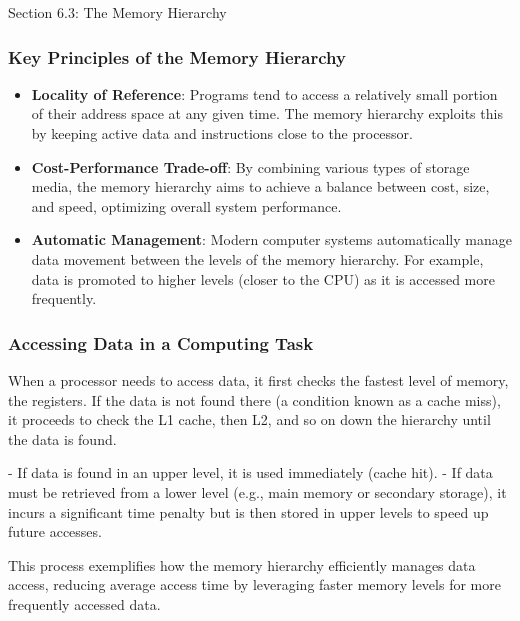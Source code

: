 \begin{notes}{Section 6.3: The Memory Hierarchy}
    \vspace*{1em}
    
    \subsubsection*{Key Principles of the Memory Hierarchy}
    
    \begin{itemize}
        \item \textbf{Locality of Reference}: Programs tend to access a relatively small portion of their address space at any given time. The memory hierarchy exploits this by keeping active data 
        and instructions close to the processor.
        \item \textbf{Cost-Performance Trade-off}: By combining various types of storage media, the memory hierarchy aims to achieve a balance between cost, size, and speed, optimizing overall system performance.
        \item \textbf{Automatic Management}: Modern computer systems automatically manage data movement between the levels of the memory hierarchy. For example, data is promoted to higher levels 
        (closer to the CPU) as it is accessed more frequently.
    \end{itemize}
    
    \begin{highlight}
        \subsubsection*{Accessing Data in a Computing Task}
    
        When a processor needs to access data, it first checks the fastest level of memory, the registers. If the data is not found there (a condition known as a cache miss), it proceeds to check the 
        L1 cache, then L2, and so on down the hierarchy until the data is found.
    
    \begin{code}
    - If data is found in an upper level, it is used immediately (cache hit).
    - If data must be retrieved from a lower level (e.g., main memory or secondary storage), it incurs a significant time penalty but is then stored in upper levels to speed up future accesses.
    \end{code}
        This process exemplifies how the memory hierarchy efficiently manages data access, reducing average access time by leveraging faster memory levels for more frequently accessed data.
    \end{highlight}
    

\end{notes}
